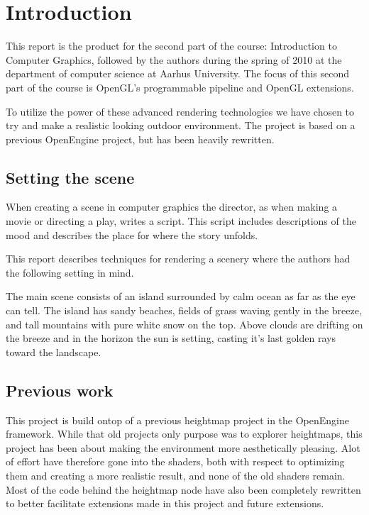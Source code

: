 
\chapter{Introduction}
This report is the product for the second part of the course:
Introduction to Computer Graphics, followed by the authors during the
spring of 2010 at the department of computer science at Aarhus
University. The focus of this second part of the course is OpenGL's
programmable pipeline and OpenGL extensions.

To utilize the power of these advanced rendering technologies we have
chosen to try and make a realistic looking outdoor environment. The
project is based on a previous OpenEngine project, but has been
heavily rewritten.


\section{Setting the scene}
When creating a scene in computer graphics the director, as when
making a movie or directing a play, writes a script. This script
includes descriptions of the mood and describes the place for where
the story unfolds.

This report describes techniques for rendering a scenery 
where the authors had the following setting in mind.

The main scene consists of an island surrounded by calm ocean as far
as the eye can tell. The island has sandy beaches, fields of grass
waving gently in the breeze, and tall mountains with pure white snow
on the top. Above clouds are drifting on the breeze and in the horizon
the sun is setting, casting it's last golden rays toward the
landscape.

\section{Previous work}
This project is build ontop of a previous heightmap project in the
OpenEngine framework. While that old projects only purpose was to
explorer heightmaps, this project has been about making the
environment more aesthetically pleasing. Alot of effort have therefore
gone into the shaders, both with respect to optimizing them and
creating a more realistic result, and none of the old shaders
remain. Most of the code behind the heightmap node have also been
completely rewritten to better facilitate extensions made in this
project and future extensions.

